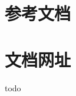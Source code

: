 \documentclass[UTF8]{ctexart}
\begin{document}
                
        
        
        
        
        
        
        
     
    \newpage
    \begin{appendices}
    \section{参考文档}
    \section{文档网址}
    todo 
    \end{appendices}
    
\end{document}
